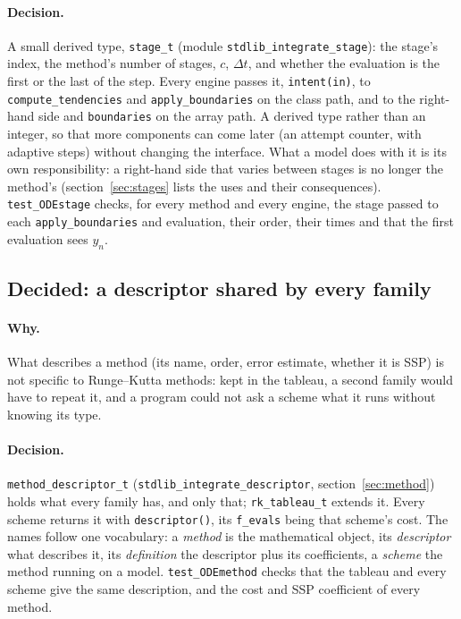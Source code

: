 \documentclass[11pt,a4paper]{article}
\newcommand{\dt}{\Delta t}
\newcommand{\code}[1]{\texttt{#1}}
\begin{document}
\paragraph{Decision.} A small derived type, \code{stage\_t} (module
\code{stdlib\_integrate\_stage}): the stage's index, the method's number of
stages, $c$, $\dt$, and whether the evaluation is the first or the last of
the step. Every engine passes it, \code{intent(in)}, to
\code{compute\_tendencies} and \code{apply\_boundaries} on the class path, and
to the right-hand side and \code{boundaries} on the array path. A derived type
rather than an integer, so that more components can come later (an attempt
counter, with adaptive steps) without changing the interface. What a model
does with it is its own responsibility: a right-hand side that varies between
stages is no longer the method's (section~\ref{sec:stages} lists the uses and
their consequences). \code{test\_ODEstage} checks, for every method and every
engine, the stage passed to each \code{apply\_boundaries} and evaluation,
their order, their times and that the first evaluation sees $y_n$.

\subsection{Decided: a descriptor shared by every family}

\paragraph{Why.} What describes a method (its name, order, error estimate,
whether it is SSP) is not specific to Runge--Kutta methods: kept in the
tableau, a second family would have to repeat it, and a program could not
ask a scheme what it runs without knowing its type.

\paragraph{Decision.} \code{method\_descriptor\_t}
(\code{stdlib\_integrate\_descriptor}, section~\ref{sec:method}) holds what
every family has, and only that; \code{rk\_tableau\_t} extends it. Every scheme
returns it with \code{descriptor()}, its \code{f\_evals} being that scheme's
cost. The names follow one vocabulary: a \emph{method} is the mathematical
object, its \emph{descriptor} what describes it, its \emph{definition} the
descriptor plus its coefficients, a \emph{scheme} the method running on a
model. \code{test\_ODEmethod} checks that the tableau and every scheme give the
same description, and the cost and SSP coefficient of every method.
\end{document}
